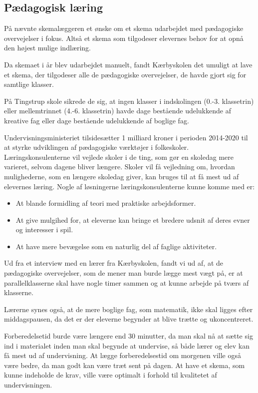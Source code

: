 \subsection{Pædagogisk læring}
\label{paedagogisk_laering}
På \school nævnte skemalæggeren et ønske om et skema udarbejdet med pædagogiske overvejelser i fokus. Altså et skema som tilgodeser elevernes behov for at opnå den højest mulige indlæring.

Da skemaet i år blev udarbejdet manuelt, fandt Kærbyskolen det umuligt at lave et skema, der tilgodeser alle de pædagogiske overvejelser, de havde gjort sig for samtlige klasser\cite{interview_Kaerby}.

På Tingstrup skole sikrede de sig, at ingen klasser i indskolingen (0.-3. klassetrin) eller mellemtrinnet (4.-6. klassetrin) havde dage bestående udelukkende af kreative fag eller dage bestående udelukkende af boglige fag. 

Undervisningsministeriet tilsidesætter 1 milliard kroner i perioden 2014-2020 til at styrke udviklingen af pædagogiske værktøjer i folkeskoler. Læringskonsulenterne vil vejlede skoler i de ting, som gør en skoledag mere varieret, selvom dagene bliver længere. Skoler vil få vejledning om, hvordan mulighederne, som en længere skoledag giver, kan bruges til at få mest ud af elevernes læring. Nogle af løsningerne læringskonsulenterne kunne komme med er:
\begin{itemize}
	\item At blande formidling af teori med praktiske arbejdsformer.
	\item At give mulgihed for, at eleverne kan bringe et bredere udsnit af deres evner og interesser i spil.
	\item At have mere bevægelse som en naturlig del af faglige aktiviteter\cite{Paedagogisklaering}.
\end{itemize}
Ud fra et interview med en lærer fra Kærbyskolen, fandt vi ud af, at de pædagogiske overvejelser, som de mener man burde lægge mest vægt på, er at parallelklasserne skal have nogle timer sammen og at kunne arbejde på tværs af klasserne.

Lærerne synes også, at de mere boglige fag, som matematik, ikke skal ligges efter middagspausen, da det er der eleverne begynder at blive trætte og ukoncentreret. 

Forberedelsetid burde være længere end 30 minutter, da man skal nå at sætte sig ind i materialet inden man skal begynde at undervise, så både lærer og elev kan få mest ud af undervisning. At lægge forberedelsestid om morgenen ville også være bedre, da man godt kan være træt sent på dagen. At have et skema, som kunne indeholde de krav, ville være optimalt i forhold til kvalitetet af undervisningen\cite{interview_Laerer}.